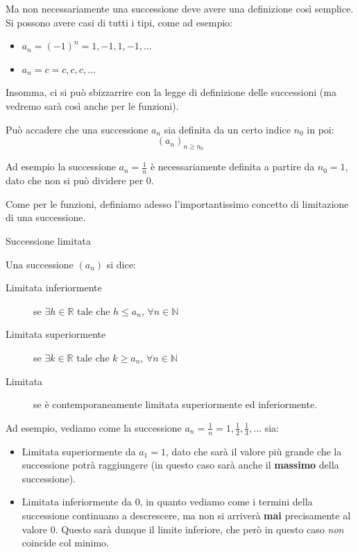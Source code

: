 \documentclass[12pt]{report}
\newcommand{\N}{\mathbb{N}}
\newcommand{\R}{\mathbb{R}}
\begin{document}
	Ma non necessariamente una successione deve avere una definizione così semplice. Si possono avere casi di tutti i tipi, come ad esempio:
	\begin{itemize}
		
		\item $a_n = (-1)^n = 1, -1, 1, -1, \dots$
		
		\item $a_n = c = c, c, c, \dots$ 
		
	\end{itemize}
	
	Insomma, ci si può sbizzarrire con la legge di definizione delle successioni (ma vedremo sarà così anche per le funzioni).
	
	\begin{osservazione}{}{}
		
		Può accadere che una successione $a_n$ sia definita da un certo indice $n_0$ in poi:
		\[
			(a_n)_{n \geq n_0}
		\]
		
	\end{osservazione}
	
	Ad esempio la successione $a_n = \frac{1}{n}$ è necessariamente definita a partire da $n_0 = 1$, dato che non si può dividere per $0$.
	
	Come per le funzioni, definiamo adesso l'importantissimo concetto di limitazione di una successione.
	
	\begin{definizione}{Successione limitata}{}
		
		Una successione $(a_n)$ si dice:
		\begin{description}
			
			\item [Limitata inferiormente] se $\exists h \in \R \text{ tale che } h \leq a_n,\,\forall n \in \N$
			
			\item [Limitata superiormente] se $\exists k \in \R \text{ tale che } k \geq a_n,\,\forall n \in \N$
			
			\item [Limitata] se è contemporaneamente limitata superiormente ed inferiormente.
			
		\end{description}
		
	\end{definizione}
	
	Ad esempio, vediamo come la successione $a_n = \frac{1}{n} = 1, \frac{1}{2}, \frac{1}{3}, \dots$ sia:
	\begin{itemize}
		
		\item Limitata superiormente da $a_1 = 1$, dato che sarà il valore più grande che la successione potrà raggiungere (in questo caso sarà anche il \textbf{massimo} della successione).
		
		\item Limitata inferiormente da $0$, in quanto vediamo come i termini della successione continuano a descrescere, ma non si arriverà \textbf{mai} precisamente al valore $0$. Questo sarà dunque il limite inferiore, che però in questo caso \textit{non} coincide col minimo.
		
	\end{itemize}
	
\end{document}
